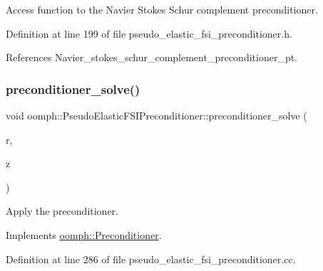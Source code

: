 Access function to the Navier Stokes Schur complement preconditioner. 



Definition at line 199 of file pseudo\+\_\+elastic\+\_\+fsi\+\_\+preconditioner.\+h.



References Navier\+\_\+stokes\+\_\+schur\+\_\+complement\+\_\+preconditioner\+\_\+pt.

\mbox{\label{classoomph_1_1PseudoElasticFSIPreconditioner_ad29c2852949caec2d20cbe7cf99f1b38}} 
\subsubsection{\texorpdfstring{preconditioner\+\_\+solve()}{preconditioner\_solve()}}
{\footnotesize\ttfamily void oomph\+::\+Pseudo\+Elastic\+F\+S\+I\+Preconditioner\+::preconditioner\+\_\+solve (\begin{DoxyParamCaption}\item[{const \hyperlink{classoomph_1_1DoubleVector}{Double\+Vector} \&}]{r,  }\item[{\hyperlink{classoomph_1_1DoubleVector}{Double\+Vector} \&}]{z }\end{DoxyParamCaption})\hspace{0.3cm}{\ttfamily [virtual]}}



Apply the preconditioner. 



Implements \hyperlink{classoomph_1_1Preconditioner_ace1199369e4465cd2b9a34884bb64ec8}{oomph\+::\+Preconditioner}.



Definition at line 286 of file pseudo\+\_\+elastic\+\_\+fsi\+\_\+preconditioner.\+cc.



